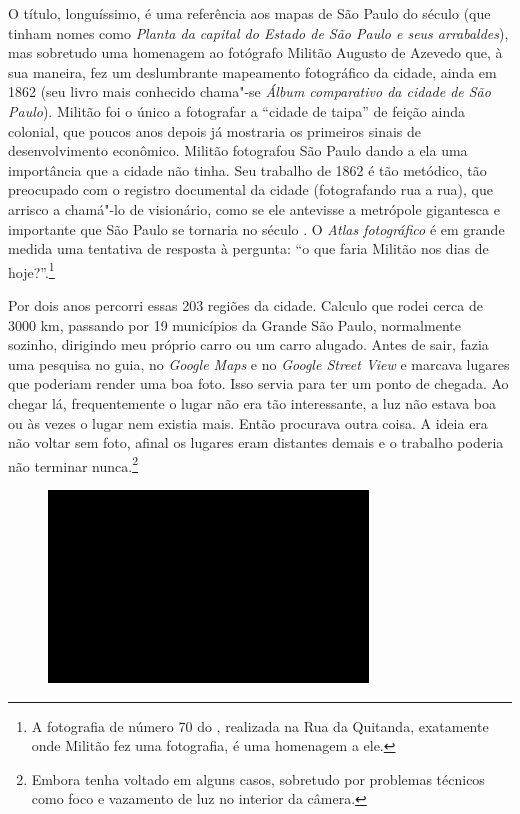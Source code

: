 O título, longuíssimo, é uma referência aos mapas de São Paulo do século
 (que tinham nomes como \emph{Planta da capital do Estado de São
Paulo e seus arrabaldes}), mas sobretudo uma homenagem ao fotógrafo
Militão Augusto de Azevedo que, à sua maneira, fez um deslumbrante
mapeamento fotográfico da cidade, ainda em 1862 (seu livro mais
conhecido chama"-se \emph{Álbum comparativo da cidade de São Paulo}).
Militão foi o único a fotografar a ``cidade de taipa'' de feição ainda
colonial, que poucos anos depois já mostraria os primeiros sinais de
desenvolvimento econômico. Militão fotografou São Paulo dando a ela uma
importância que a cidade não tinha. Seu trabalho de 1862 é tão metódico,
tão preocupado com o registro documental da cidade (fotografando rua a
rua), que arrisco a chamá"-lo de visionário, como se ele antevisse a
metrópole gigantesca e importante que São Paulo se tornaria no século
. O \emph{Atlas fotográfico} é em grande medida uma tentativa de
resposta à pergunta: ``o que faria Militão nos dias de hoje?''.\footnote{A
  fotografia de número 70 do {}, realizada na Rua da Quitanda,
  exatamente onde Militão fez uma fotografia, é uma homenagem a ele.}

Por dois anos percorri essas 203 regiões da cidade. Calculo que rodei
cerca de 3000 km, passando por 19 municípios da Grande São Paulo,
normalmente sozinho, dirigindo meu próprio carro ou um carro alugado.
Antes de sair, fazia uma pesquisa no guia, no \emph{Google Maps} e no
\emph{Google Street View} e marcava lugares que poderiam render uma boa
foto. Isso servia para ter um ponto de chegada. Ao chegar lá,
frequentemente o lugar não era tão interessante, a luz não estava boa ou
às vezes o lugar nem existia mais. Então procurava outra coisa. A ideia
era não voltar sem foto, afinal os lugares eram distantes demais e o
trabalho poderia não terminar nunca.\footnote{Embora tenha voltado em
  alguns casos, sobretudo por problemas técnicos como foco e vazamento
  de luz no interior da câmera.}

\begin{figure}[!ht]

\centering
 \includegraphics[width=85mm]{./imgs/im1.jpg}
\caption{\tiny{}}

\end{figure}

